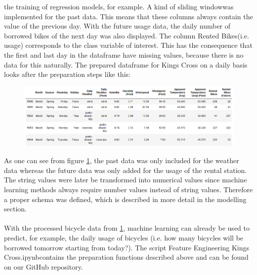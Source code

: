 the training of regression models, for example. A kind of \glqq sliding window\grqq was implemented for
the past data. This means that these columns always contain the value of the previous day. With
the future usage data, the daily number of borrowed bikes of the next day was also displayed. The
column \glqq Rented Bikes\grqq (i.e. usage) corresponds to the class variable of interest. This has the
consequence that the first and last day in the dataframe have missing values, because there is no
data for this naturally. The prepared dataframe for Kings Cross on a daily basis looks after the
preparation steps like this:
\begin{figure}[H]
\hspace{-2.8cm}
\includegraphics[width=1.4\textwidth]{img/figure6_kings_cross_df}\label{fig:figure6_kings_cross_df}
\label{fig:figure6_kings_cross_df}
\end{figure}
As one can see from figure \ref{fig:figure6_kings_cross_df}, the past data was only included for the weather data whereas the
future data was only added for the usage of the rental station. The string values were later be
transformed into numerical values since machine learning methods always require number values
instead of string values. Therefore a proper schema was defined, which is described in more detail
in the modelling section.\\\\
With the processed bicycle data from \ref{fig:figure6_kings_cross_df}, machine learning can already be used to predict,
for example, the daily usage of bicycles (i.e. how many bicycles will be borrowed tomorrow starting
from today?). The script \glqq Feature Engineering Kings Cross.ipynb\grqq contains the preparation
functions described above and can be found on our GitHub repository.
